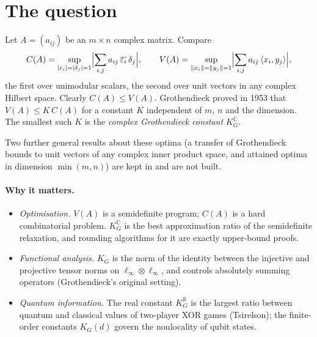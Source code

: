 \documentclass[11pt,a4paper]{article}
\newcommand{\C}{\mathbb{C}}
\newcommand{\R}{\mathbb{R}}
\newcommand{\KG}{K_G^{\C}}
\begin{document}
\section{The question}
Let $A=(a_{ij})$ be an $m\times n$ complex matrix. Compare
\[
 C(A)=\sup_{|\varepsilon_i|=|\delta_j|=1}\Bigl|\sum_{i,j}a_{ij}\,\overline{\varepsilon_i}\,\delta_j\Bigr|,
 \qquad
 V(A)=\sup_{\|x_i\|=\|y_j\|=1}\Bigl|\sum_{i,j}a_{ij}\,\langle x_i,y_j\rangle\Bigr|,
\]
the first over unimodular scalars, the second over unit vectors in any complex Hilbert space. Clearly $C(A)\le V(A)$.
Grothendieck proved in 1953 that $V(A)\le K\,C(A)$ for a constant $K$ independent of $m$, $n$ and the dimension. The smallest
such $K$ is the \emph{complex Grothendieck constant} $\KG$.

Two further general results about these optima (a transfer
of Grothendieck bounds to unit vectors of any complex inner product space,
and attained optima in dimension $\min(m,n)$) are kept in  and are
not built.

\paragraph{Why it matters.}
\begin{itemize}
\item \emph{Optimisation.} $V(A)$ is a semidefinite program; $C(A)$ is a hard combinatorial problem. $\KG$ is the best
 approximation ratio of the semidefinite relaxation, and rounding algorithms for it are exactly upper-bound proofs.
\item \emph{Functional analysis.} $K_G$ is the norm of the identity between the injective and projective tensor
 norms on $\ell_\infty\otimes\ell_\infty$, and controls absolutely summing operators (Grothendieck's original setting).
\item \emph{Quantum information.} The real constant $K_G^{\R}$ is the largest ratio between quantum and classical values of
 two-player XOR games (Tsirelson); the finite-order constants $K_G(d)$ govern the nonlocality of qubit states.
\end{itemize}
\end{document}
